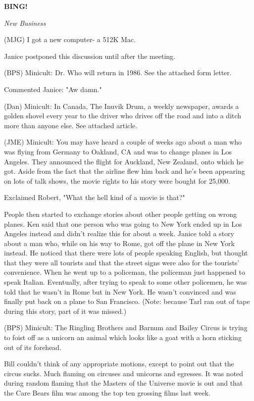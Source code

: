 \documentclass[12pt]{article}
\newcommand{\bing}{{\bf BING!} }
\newcommand{\goto}[1]{\bing \vskip 12pt \centerline{{\em{#1}}}}
\begin{document}
\goto{New Business}

(MJG) I got a new computer- a 512K Mac.

Janice postponed this discussion until after the meeting.

(BPS) Minicult: Dr. Who will return in 1986. See the attached form letter.

Commented Janice: "Aw damn."

(Dan) Minicult: In Canada, The Inuvik Drum, a weekly newspaper, awards a golden shovel every year to the driver who drives off the road and into a ditch more than anyone else. See attached article.

(JME) Minicult: You may have heard a couple of weeks ago about a man who was flying from Germany to Oakland, CA and was to change planes in Los Angeles. They announced the flight for Auckland, New Zealand, onto which he got. Aside from the fact that the airline flew him back and he's been appearing on lots of talk shows, the movie rights to his story were bought for 25,000.

Exclaimed Robert, "What the hell kind of a movie is that?"

People then started to exchange stories about other people getting on wrong planes. Ken said that one person who was going to New York ended up in Los Angeles instead and didn't realize this for about a week. Janice told a story about a man who, while on his way to Rome, got off the plane in New York instead. He noticed that there were lots of people speaking English, but thought that they were all tourists and that the street signs were also for the tourists' convenience. When he went up to a policeman, the policeman just happened to speak Italian. Eventually, after trying to speak to some other policemen, he was told that he wasn't in Rome but in New York. He wasn't convinced and was finally put back on a plane to San Francisco. (Note: because Tarl ran out of tape during this story, part of it was missed.)

(BPS) Minicult: The Ringling Brothers and Barnum and Bailey Circus is trying to foist off as a unicorn an animal which looks like a goat with a horn sticking out of its forehead.

Bill couldn't think of any appropriate motions, except to point out that the circus sucks. Much flaming on circuses and unicorns and egresses. It was noted during random flaming that the Masters of the Universe movie is out and that the Care Bears film was among the top ten grossing films last week.
\end{document}

